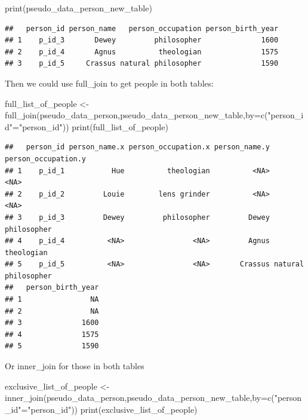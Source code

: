 \documentclass[
]{book}
\newenvironment{Shaded}{\begin{snugshade}}{\end{snugshade}}
\newcommand{\AttributeTok}[1]{\textcolor[rgb]{0.77,0.63,0.00}{#1}}
\newcommand{\FunctionTok}[1]{\textcolor[rgb]{0.00,0.00,0.00}{#1}}
\newcommand{\NormalTok}[1]{#1}
\newcommand{\OtherTok}[1]{\textcolor[rgb]{0.56,0.35,0.01}{#1}}
\newcommand{\StringTok}[1]{\textcolor[rgb]{0.31,0.60,0.02}{#1}}
\begin{document}
\begin{Shaded}
\begin{Highlighting}[]
\FunctionTok{print}\NormalTok{(pseudo\_data\_person\_new\_table)}
\end{Highlighting}
\end{Shaded}

\begin{verbatim}
##   person_id person_name   person_occupation person_birth_year
## 1    p_id_3       Dewey         philosopher              1600
## 2    p_id_4       Agnus          theologian              1575
## 3    p_id_5     Crassus natural philosopher              1590
\end{verbatim}

Then we could use full\_join to get people in both tables:

\begin{Shaded}
\begin{Highlighting}[]
\NormalTok{full\_list\_of\_people }\OtherTok{\textless{}{-}} \FunctionTok{full\_join}\NormalTok{(pseudo\_data\_person,pseudo\_data\_person\_new\_table,}\AttributeTok{by=}\FunctionTok{c}\NormalTok{(}\StringTok{"person\_id"}\OtherTok{=}\StringTok{"person\_id"}\NormalTok{))}
\FunctionTok{print}\NormalTok{(full\_list\_of\_people)}
\end{Highlighting}
\end{Shaded}

\begin{verbatim}
##   person_id person_name.x person_occupation.x person_name.y person_occupation.y
## 1    p_id_1           Hue          theologian          <NA>                <NA>
## 2    p_id_2         Louie        lens grinder          <NA>                <NA>
## 3    p_id_3         Dewey         philosopher         Dewey         philosopher
## 4    p_id_4          <NA>                <NA>         Agnus          theologian
## 5    p_id_5          <NA>                <NA>       Crassus natural philosopher
##   person_birth_year
## 1                NA
## 2                NA
## 3              1600
## 4              1575
## 5              1590
\end{verbatim}

Or inner\_join for those in both tables

\begin{Shaded}
\begin{Highlighting}[]
\NormalTok{exclusive\_list\_of\_people }\OtherTok{\textless{}{-}} \FunctionTok{inner\_join}\NormalTok{(pseudo\_data\_person,pseudo\_data\_person\_new\_table,}\AttributeTok{by=}\FunctionTok{c}\NormalTok{(}\StringTok{"person\_id"}\OtherTok{=}\StringTok{"person\_id"}\NormalTok{))}
\FunctionTok{print}\NormalTok{(exclusive\_list\_of\_people)}
\end{Highlighting}
\end{Shaded}
\end{document}
